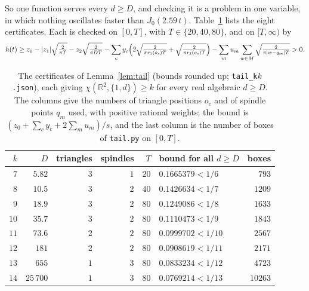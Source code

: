 \documentclass[11pt,a4paper]{amsart}
\theoremstyle{definition}
\theoremstyle{remark}
\newcommand{\R}{\mathbb{R}}
\begin{document}
So one function serves every $d\ge D$, and checking it is a problem in one variable, in which nothing oscillates
faster than $J_0(2.59\,t)$. Table~\ref{tab:uniform} lists the eight certificates. Each is checked on $[0,T]$, with
$T\in\{20,40,80\}$, and on $[T,\infty)$ by
\[
h(t)\ge z_0-|z_1|\sqrt{\tfrac2{\pi T}}-z_2\sqrt{\tfrac2{\pi DT}}
-\sum_cy_c\Bigl(2\sqrt{\tfrac2{\pi r_1(o_c)T}}+\sqrt{\tfrac2{\pi r_3(o_c)T}}\Bigr)
-\sum_mu_m\sum_{w\in M}\sqrt{\tfrac2{\pi|w-q_m|T}}>0.
\]

\begin{table}[ht]
\centering
\small
\begin{tabular}{rrrrrlr}
\toprule
$k$ & $D$ & triangles & spindles & $T$ & bound for all $d\ge D$ & boxes\\
\midrule
$7$ & $5.82$ & $3$ & $1$ & $20$ & $0.1665379<1/6$ & $793$\\
$8$ & $10.5$ & $3$ & $2$ & $40$ & $0.1426634<1/7$ & $1209$\\
$9$ & $18.9$ & $3$ & $2$ & $80$ & $0.1249086<1/8$ & $1633$\\
$10$ & $35.7$ & $3$ & $2$ & $80$ & $0.1110473<1/9$ & $1843$\\
$11$ & $73.6$ & $2$ & $2$ & $80$ & $0.0999702<1/10$ & $2567$\\
$12$ & $181$ & $2$ & $2$ & $80$ & $0.0908619<1/11$ & $2171$\\
$13$ & $655$ & $1$ & $3$ & $80$ & $0.0833234<1/12$ & $4723$\\
$14$ & $25\,700$ & $1$ & $3$ & $80$ & $0.0769214<1/13$ & $10263$\\
\bottomrule
\end{tabular}
\caption{The certificates of Lemma~\ref{lem:tail} (bounds rounded up; \texttt{tail\_k$k$.json}), each giving
$\chi(\R^2,\{1,d\})\ge k$ for every real algebraic $d\ge D$. The columns give the numbers of triangle positions
$o_c$ and of spindle points $q_m$ used, with positive rational weights; the bound is $(z_0+\sum_cy_c+2\sum_mu_m)/s$, and
the last column is the number of boxes of \texttt{tail.py} on $[0,T]$.}
\label{tab:uniform}
\end{table}
\end{document}
